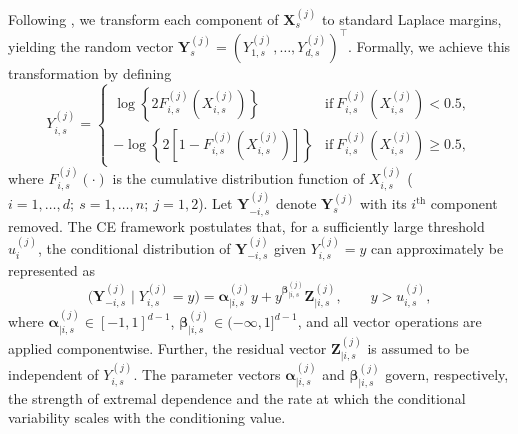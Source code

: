\documentclass[APA,STIX1COL]{WileyNJD-v2}
\begin{document}
Following \citet{Keef2013}, we transform each component of $\boldsymbol{X}_s^{(j)}$ to standard Laplace margins, yielding the random vector $\boldsymbol{Y}_s^{(j)} = \left(Y_{1,s}^{(j)}, \ldots, Y_{d,s}^{(j)}\right)^\top$. Formally, we achieve this transformation by defining
\begin{equation}
Y_{i,s}^{(j)} =
\begin{cases}
\log\left\{2 F_{i,s}^{(j)}\left(X_{i,s}^{(j)}\right)\right\} & \mbox{if}~F_{i,s}^{(j)}\left(X_{i,s}^{(j)}\right) < 0.5,\\
-\log\left\{2 \left[1-F_{i,s}^{(j)}\left(X_{i,s}^{(j)}\right)\right]\right\} & \mbox{if}~F_{i,s}^{(j)}\left(X_{i,s}^{(j)}\right) \geq 0.5,
\end{cases}
\label{eq:Laplace}
\end{equation}
where $F_{i,s}^{(j)}(\cdot)$ is the cumulative distribution function of $X_{i,s}^{(j)}$ ($i=1,\ldots,d;~s=1,\ldots,n;~j=1,2$). Let $\boldsymbol{Y}^{(j)}_{-i,s}$ denote $\boldsymbol{Y}^{(j)}_s$ with its $i^{\mathrm{th}}$ component removed. The CE framework postulates that, for a sufficiently large threshold $u_i^{(j)}$, the conditional distribution of $\boldsymbol{Y}_{-i,s}^{(j)}$ given $Y_{i,s}^{(j)} = y$ can approximately be represented as 
\begin{equation}
\label{eq:ce_model_spat}
\bigl(\boldsymbol{Y}_{-i,s}^{(j)} \mid Y_{i,s}^{(j)} = y\bigr)
=
\boldsymbol{\alpha}_{\mid i,s}^{(j)} y
+
y^{\boldsymbol{\beta}_{\mid i,s}^{(j)}}
\boldsymbol{Z}_{\mid i,s}^{(j)},
\qquad y > u_{i,s}^{(j)},
\end{equation}
where $\boldsymbol{\alpha}_{\mid i,s}^{(j)}\in[-1,1]^{d-1}$, $\boldsymbol{\beta}_{\mid i,s}^{(j)}\in(-\infty,1]^{d-1}$, and all vector operations are applied componentwise. Further, the residual vector $\boldsymbol{Z}_{\mid i,s}^{(j)}$ is assumed to be independent of $Y_{i,s}^{(j)}$. The parameter vectors $\boldsymbol{\alpha}_{\mid i,s}^{(j)}$ and $\boldsymbol{\beta}_{\mid i,s}^{(j)}$ govern, respectively, the strength of extremal dependence and the rate at which the conditional variability scales with the conditioning value. 
\end{document}
